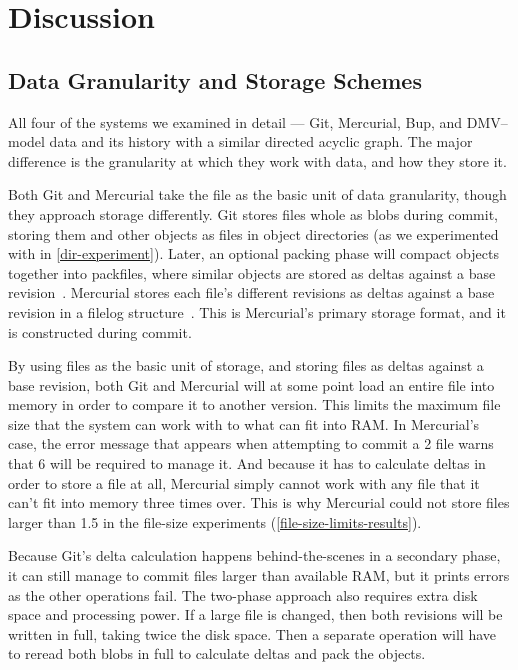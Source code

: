 \chapter{Discussion}


\section{Data Granularity and Storage Schemes}
\label{chunk-then-recombine}

All four of the systems we examined in detail --- Git, Mercurial, Bup, and
\gls{DMV}-- model data and its history with a similar directed acyclic graph.
The major difference is the granularity at which they work with data, and how
they store it.

Both Git and Mercurial take the file as the basic unit of data granularity,
though they approach storage differently. Git stores files whole as \glspl{blob}
during \gls{commit}, storing them and other objects as files in object
directories (as we experimented with in \autoref{dir-experiment}). Later, an
optional packing phase will compact objects together into \glspl{packfile},
where similar objects are stored as deltas against a base revision~\cite[Section
10.4]{git_book}. Mercurial stores each file's different revisions as deltas
   against a base revision in a \gls{filelog} structure~\cite[Chapter
   4]{hgbook}. This is Mercurial's primary storage format, and it is constructed
     during \gls{commit}.

By using files as the basic unit of storage, and storing files as deltas against
a base revision, both Git and Mercurial will at some point load an entire file
into memory in order to compare it to another version. This limits the maximum
file size that the system can work with to what can fit into RAM. In Mercurial's
case, the error message that appears when attempting to \gls{commit} a
\SI{2}{\gib} file warns that \SI{6}{\gib} will be required to manage it. And
because it has to calculate deltas in order to store a file at all, Mercurial
simply cannot work with any file that it can't fit into memory three times over.
This is why Mercurial could not store files larger than \SI{1.5}{\gib} in the
file-size experiments (\autoref{file-size-limits-results}).

Because Git's delta calculation happens behind-the-scenes in a secondary phase,
it can still manage to \gls{commit} files larger than available RAM, but it
prints errors as the other operations fail. The two-phase approach also requires
extra disk space and processing power. If a large file is changed, then both
revisions will be written in full, taking twice the disk space. Then a separate
operation will have to reread both \glspl{blob} in full to calculate deltas and
pack the objects.

